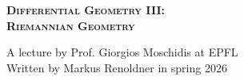

\begin{titlepage}
\begin{center}

    
\vspace*{8cm}

{\Huge\bfseries\scshape Differential Geometry III:\\ \vspace{0.2cm} Riemannian Geometry}





\vspace{2cm}
{\Large A lecture by Prof. Giorgios Moschidis at EPFL\\}
\vspace{0.2cm}
{\Large Written by Markus Renoldner in spring 2026\\}



\vspace{4cm}


\vfill
\end{center}
\end{titlepage}
